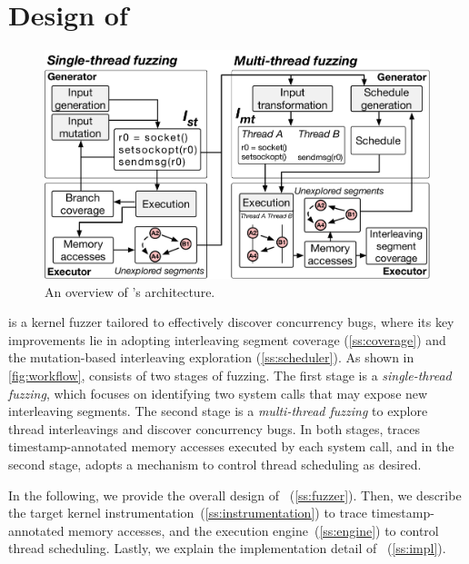 \section{Design of \sys}
\label{s:impl}

\begin{figure}
  \centering
  \includegraphics[width=0.95\linewidth]{fig/architecture.pdf}
  \caption{An overview of \sys's architecture.}
  \label{fig:workflow}
  \vspace{-5pt}
\end{figure}

\sys is a kernel fuzzer tailored to effectively discover concurrency
bugs, where its key improvements lie in adopting interleaving segment
coverage (\autoref{ss:coverage}) and the mutation-based interleaving
exploration (\autoref{ss:scheduler}).
%
As shown in \autoref{fig:workflow}, \sys consists of two stages of
fuzzing.
%
The first stage is a \textit{single-thread fuzzing}, which focuses on
identifying two system calls that may expose new interleaving
segments.
%
The second stage is a \textit{multi-thread fuzzing} to explore thread
interleavings and discover concurrency bugs.
%
In both stages, \sys traces timestamp-annotated memory accesses
executed by each system call, and in the second stage, \sys adopts a
mechanism to control thread scheduling as desired.



In the following, we provide the overall design of
\sys~(\autoref{ss:fuzzer}).
%
Then, we describe the target kernel
instrumentation~(\autoref{ss:instrumentation}) to trace
timestamp-annotated memory accesses, and the execution
engine~(\autoref{ss:engine}) to control thread scheduling.
%
Lastly, we explain the implementation detail of
\sys~(\autoref{ss:impl}).




